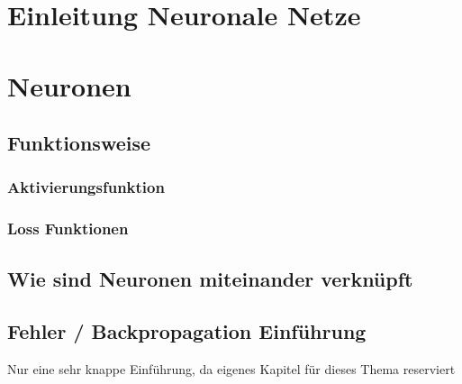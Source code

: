 \newpage
\thispagestyle{empty}
\section{Einleitung Neuronale Netze}\label{sec:einleitung_nn}   

\vspace{1cm}




\newpage  
\section{Neuronen}\label{sec:neuronen}
  
\newpage
\subsection{Funktionsweise}\label{subsec:neuronen:funktionsweise}
  
 
\subsubsection{Aktivierungsfunktion}\label{subsec:neuronen:aktivierungsfunktion}
   

\subsubsection{Loss Funktionen}

\newpage


\subsection{Wie sind Neuronen miteinander verknüpft}\label{subsec:neuronen:verknuepfung_neuronen}  


\subsection{Fehler / Backpropagation Einführung}\label{subsec:neuronen:fehler_backpropagation}
Nur eine sehr knappe Einführung, da eigenes Kapitel für dieses Thema reserviert

